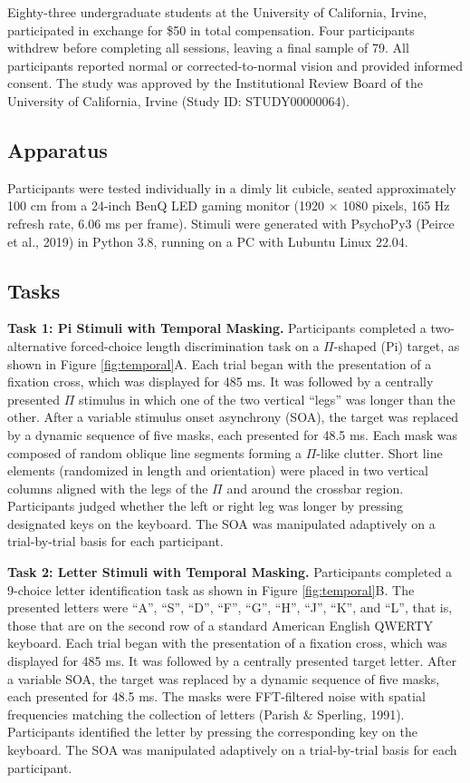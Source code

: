 \documentclass[
  ,man]{apa6}
\begin{document}
Eighty-three undergraduate students at the University of California, Irvine, participated in exchange for \$50 in total compensation. Four participants withdrew before completing all sessions, leaving a final sample of 79. All participants reported normal or corrected-to-normal vision and provided informed consent. The study was approved by the Institutional Review Board of the University of California, Irvine (Study ID: STUDY00000064).

\subsection{Apparatus}\label{apparatus}

Participants were tested individually in a dimly lit cubicle, seated approximately 100 cm from a 24-inch BenQ LED gaming monitor (1920 × 1080 pixels, 165 Hz refresh rate, 6.06 ms per frame). Stimuli were generated with PsychoPy3 (Peirce et al., 2019) in Python 3.8, running on a PC with Lubuntu Linux 22.04.

\subsection{Tasks}\label{tasks}

\textbf{Task 1: Pi Stimuli with Temporal Masking.} Participants completed a two-alternative forced-choice length discrimination task on a \(\Pi\)-shaped (Pi) target, as shown in Figure \ref{fig:temporal}A. Each trial began with the presentation of a fixation cross, which was displayed for 485 ms. It was followed by a centrally presented \(\Pi\) stimulus in which one of the two vertical ``legs'' was longer than the other. After a variable stimulus onset asynchrony (SOA), the target was replaced by a dynamic sequence of five masks, each presented for 48.5 ms. Each mask was composed of random oblique line segments forming a \(\Pi\)-like clutter. Short line elements (randomized in length and orientation) were placed in two vertical columns aligned with the legs of the \(\Pi\) and around the crossbar region. Participants judged whether the left or right leg was longer by pressing designated keys on the keyboard. The SOA was manipulated adaptively on a trial-by-trial basis for each participant.

\textbf{Task 2: Letter Stimuli with Temporal Masking.} Participants completed a 9-choice letter identification task as shown in Figure \ref{fig:temporal}B. The presented letters were ``A'', ``S'', ``D'', ``F'', ``G'', ``H'', ``J'', ``K'', and ``L'', that is, those that are on the second row of a standard American English QWERTY keyboard. Each trial began with the presentation of a fixation cross, which was displayed for 485 ms. It was followed by a centrally presented target letter. After a variable SOA, the target was replaced by a dynamic sequence of five masks, each presented for 48.5 ms. The masks were FFT-filtered noise with spatial frequencies matching the collection of letters (Parish \& Sperling, 1991). Participants identified the letter by pressing the corresponding key on the keyboard. The SOA was manipulated adaptively on a trial-by-trial basis for each participant.
\end{document}
